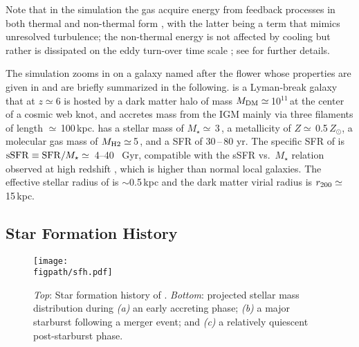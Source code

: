 \IfFileExists{emulateapjlegacy.cls}{\documentclass[iop]{emulateapjlegacy}}{\documentclass[iop]{emulateapj}}
\def\figpath{./Fig}
\begin{document}
Note that in the simulation the gas acquire energy from feedback processes in both thermal and non-thermal form \citep{agertz:2013}, with the latter being a term that mimics unresolved turbulence; the non-thermal energy is not affected by cooling but rather is dissipated on the eddy turn-over time scale \citep{maclow1999turb}; see \citet{Pallottini17b} for further details.

The simulation zooms in on a galaxy named after the flower \flower whose properties are given in \citet{Pallottini17a} and are briefly summarized in the following. \flower is a Lyman-break galaxy that at $z\simeq 6$ is hosted by a dark matter halo of mass $M_{\rm DM}\simeq$\,10$^{11}$\,\Msun at the center of a cosmic web knot, and accretes mass from the IGM mainly via three filaments of length $\simeq$\,100\,kpc. \flower has a stellar mass of $M_\star\simeq$\,3\,\Msun, a metallicity of $Z\simeq$\,0.5\,$Z_{\odot}$, a molecular gas mass of $M_{\rm H2}\simeq$\,5\,\Msun, and a SFR of 30\,--\,80\,\Msun\,yr\pmOne. 
%
The specific SFR of \flower is ${\rm sSFR} \equiv {\rm SFR}/M_{\star} \simeq$~4--40 ~Gyr\pmOne, compatible with the sSFR vs.\ $M_{\star}$ relation observed at high redshift \citep{Jiang2016}, which is higher than normal local galaxies. The effective stellar radius of \flower is $\sim$0.5\,kpc and the dark matter virial radius is $r_{\rm 200}\simeq$\,15\,kpc. 

\subsection{Star Formation History} \label{sec:sfh}

\begin{figure*}
\centering
\texttt{[image: \\figpath/sfh.pdf]}
\caption{
    {\it Top}: Star formation history of \flower. {\it Bottom}:
    projected stellar mass distribution during {\it (a)} an early
    accreting phase;  {\it (b)} a major starburst following a merger
    event; and {\it (c)} a relatively quiescent post-starburst
    phase. 
\label{fig:SFH}}
\end{figure*}
\end{document}
